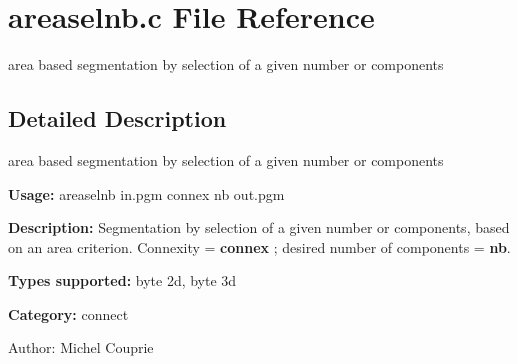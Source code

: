 \section{areaselnb.c File Reference}
\label{areaselnb_8c}
area based segmentation by selection of a given number or components 



\subsection{Detailed Description}
area based segmentation by selection of a given number or components 

{\bf Usage:} areaselnb in.pgm connex nb out.pgm

{\bf Description:} Segmentation by selection of a given number or components, based on an area criterion. Connexity = {\bf connex} ; desired number of components = {\bf nb}.

{\bf Types supported:} byte 2d, byte 3d

{\bf Category:} connect

\begin{Desc}
\item[Author:]Michel Couprie \end{Desc}
